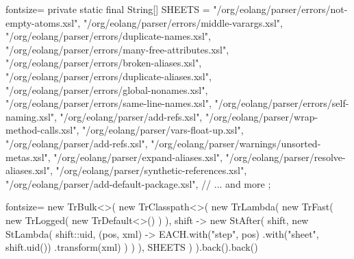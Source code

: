 \documentclass{article}
\begin{document}
\plush{}
\begin{pptWide}{2}
\begin{ffcode*}{fontsize=\scriptsize}
private static final String[] SHEETS = {
  "/org/eolang/parser/errors/not-empty-atoms.xsl",
  "/org/eolang/parser/errors/middle-varargs.xsl",
  "/org/eolang/parser/errors/duplicate-names.xsl",
  "/org/eolang/parser/errors/many-free-attributes.xsl",
  "/org/eolang/parser/errors/broken-aliases.xsl",
  "/org/eolang/parser/errors/duplicate-aliases.xsl",
  "/org/eolang/parser/errors/global-nonames.xsl",
  "/org/eolang/parser/errors/same-line-names.xsl",
  "/org/eolang/parser/errors/self-naming.xsl",
  "/org/eolang/parser/add-refs.xsl",
  "/org/eolang/parser/wrap-method-calls.xsl",
  "/org/eolang/parser/vars-float-up.xsl",
  "/org/eolang/parser/add-refs.xsl",
  "/org/eolang/parser/warnings/unsorted-metas.xsl",
  "/org/eolang/parser/expand-aliases.xsl",
  "/org/eolang/parser/resolve-aliases.xsl",
  "/org/eolang/parser/synthetic-references.xsl",
  "/org/eolang/parser/add-default-package.xsl",
  // ... and more
};
\end{ffcode*}
\columnbreak
\begin{ffcode*}{fontsize=\scriptsize}
new TrBulk<>(
  new TrClasspath<>(
    new TrLambda(
      new TrFast(
        new TrLogged(
          new TrDefault<>()
        )
      ),
      shift -> new StAfter(
        shift,
        new StLambda(
          shift::uid,
          (pos, xml) -> EACH.with("step", pos)
            .with("sheet", shift.uid())
            .transform(xml)
        )
      )
    ),
    SHEETS
  )
).back().back()
\end{ffcode*}
\end{pptWide}

\end{document}

